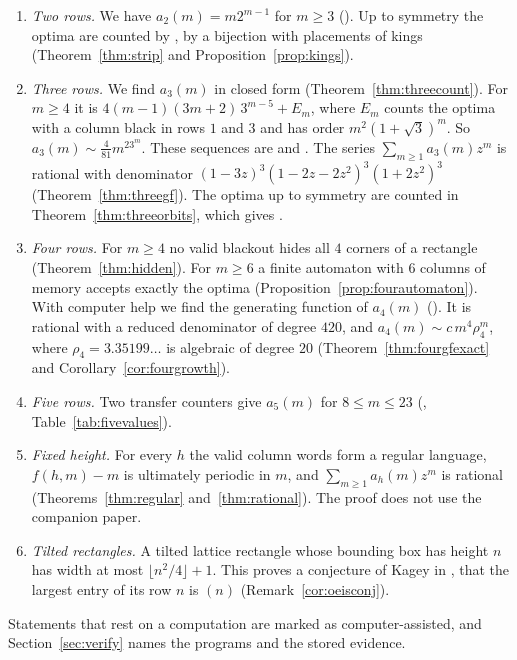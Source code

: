 \begin{enumerate}[(1),leftmargin=*]
\item \emph{Two rows.} We have $a_2(m)=m2^{m-1}$ for $m\ge3$ ().
Up to symmetry the optima are counted by , by a bijection with
placements of kings (Theorem~\ref{thm:strip} and Proposition~\ref{prop:kings}).
\item \emph{Three rows.} We find $a_3(m)$ in closed form
(Theorem~\ref{thm:threecount}). For $m\ge4$ it is $4(m-1)(3m+2)\,3^{m-5}+E_m$,
where $E_m$ counts the optima with a column black in rows $1$ and $3$ and has
order $m^2(1+\sqrt3)^m$. So $a_3(m)\sim\frac4{81}m^23^m$. These sequences are
 and . The series $\sum_{m\ge1}a_3(m)z^m$ is
rational with denominator $(1-3z)^3(1-2z-2z^2)^3(1+2z^2)^3$
(Theorem~\ref{thm:threegf}). The optima up to symmetry are counted in
Theorem~\ref{thm:threeorbits}, which gives .
\item \emph{Four rows.} For $m\ge4$ no valid blackout hides all $4$ corners of a
rectangle (Theorem~\ref{thm:hidden}). For $m\ge6$ a finite automaton with $6$
columns of memory accepts exactly the optima
(Proposition~\ref{prop:fourautomaton}). With computer help we find the generating function of $a_4(m)$
(). It is rational with a reduced denominator of degree $420$, and
$a_4(m)\sim c\,m^4\rho_4^m$, where $\rho_4=3.35199\ldots$ is algebraic of
degree $20$ (Theorem~\ref{thm:fourgfexact} and Corollary~\ref{cor:fourgrowth}).
\item \emph{Five rows.} Two transfer counters give $a_5(m)$ for $8\le m\le23$
(, Table~\ref{tab:fivevalues}).
\item \emph{Fixed height.} For every $h$ the valid column words form a regular
language, $f(h,m)-m$ is ultimately periodic in $m$, and $\sum_{m\ge1}a_h(m)z^m$
is rational (Theorems~\ref{thm:regular} and~\ref{thm:rational}). The proof does
not use the companion paper.
\item \emph{Tilted rectangles.} A tilted lattice rectangle whose bounding box has
height $n$ has width at most $\lfloor n^2/4\rfloor+1$. This proves a conjecture
of Kagey in , that the largest entry of its row $n$ is
$(n)$ (Remark~\ref{cor:oeisconj}).
\end{enumerate}

Statements that rest on a computation are marked as computer-assisted, and
Section~\ref{sec:verify} names the programs and the stored evidence.

